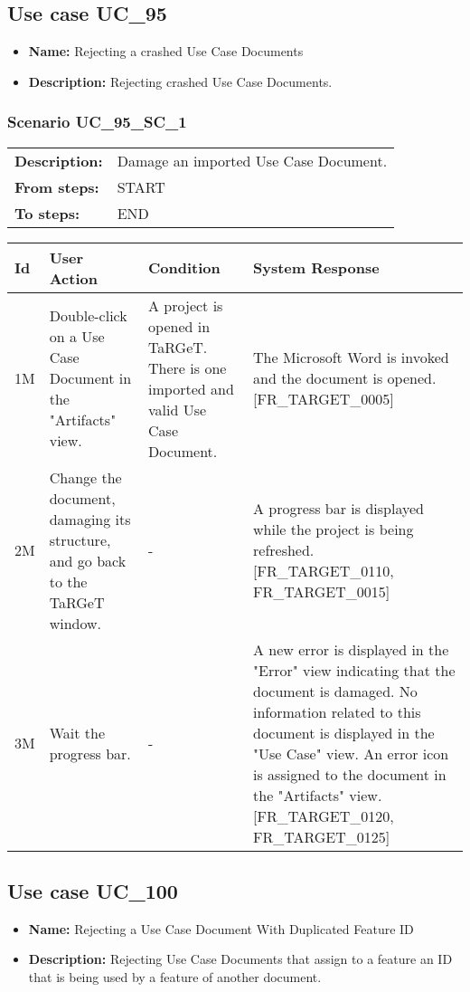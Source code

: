 \documentclass[a4paper,11pt]{article}
\newcommand{\bl}{\\ \hline}
\begin{document}
\subsection*{Use case UC_95}
\begin{itemize}
\item {\bf Name: }Rejecting a crashed Use Case Documents
\item {\bf Description: }Rejecting crashed Use Case Documents.
\end{itemize}
\subsubsection*{Scenario UC_95_SC_1}
\begin{tabular}{p{1in}p{4in}}
{\bf Description:} & Damage an imported Use Case Document. \\
{\bf From steps:} & START \\
{\bf To steps:} & END \\
\end{tabular}
 
\begin{tabular}{|p{0.8in}|p{1.6in}|p{1.6in}|p{1.6in}|}
\hline
Id & User Action & Condition & System Response  \bl 
1M & Double-click on a Use Case Document in the "Artifacts" view. & A project is opened in TaRGeT. There is one imported and valid Use Case Document. & The Microsoft Word is invoked and the document is opened. [FR_TARGET_0005] \bl 
2M & Change the document, damaging its structure, and go back to the TaRGeT window. & - & A progress bar is displayed while the project is being refreshed. [FR_TARGET_0110, FR_TARGET_0015] \bl 
3M & Wait the progress bar. & - & A new error is displayed in the "Error" view indicating that the document is damaged. No information related to this document is displayed in the "Use Case" view. An error icon is assigned to the document in the "Artifacts" view. [FR_TARGET_0120, FR_TARGET_0125] \bl 
\end{tabular}
\subsection*{Use case UC_100}
\begin{itemize}
\item {\bf Name: }Rejecting a Use Case Document With Duplicated Feature ID
\item {\bf Description: }Rejecting Use Case Documents that assign to a feature an ID that is being used by a feature of another document.
\end{itemize}
\end{document}
